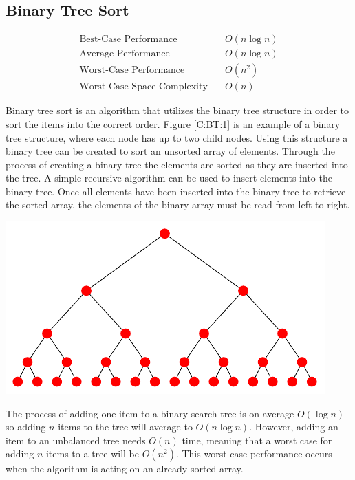 \documentclass{subfile}
\begin{document}
\subsection{Binary Tree Sort}\label{C:BT}
\begin{align*}
 \text{Best-Case Performance}\quad       & O\left(n\log n\right) \\
 \text{Average Performance}\quad         & O\left(n\log n\right) \\
 \text{Worst-Case Performance}\quad      & O\left(n^{2}\right)   \\
 \text{Worst-Case Space Complexity}\quad & O\left(n\right)
\end{align*}
\begin{multicols}{2}
 Binary tree sort is an algorithm that utilizes the binary tree structure in order to sort the items into the correct order. Figure \ref{C:BT:1} is an example of a binary tree structure, where each node has up to two child nodes. Using this structure a binary tree can be created to sort an unsorted array of elements. Through the process of creating a binary tree the elements are sorted as they are inserted into the tree. A simple recursive algorithm can be used to insert elements into the binary tree. Once all elements have been inserted into the binary tree to retrieve the sorted array, the elements of the binary array must be read from left to right.
 \begin{Figure}
  \centering
  \includegraphics[width=\linewidth]{comparison_sorts/binary_tree/img1.pdf}
 \end{Figure}\label{C:BT:1}
 \par
 The process of adding one item to a binary search tree is on average $O\left(\log n\right)$ so adding $n$ items to the tree will average to $O\left( n \log n \right)$. However, adding an item to an unbalanced tree needs $O\left( n\right)$ time, meaning that a worst case for adding $n$ items to a tree will be $O\left( n^{2} \right)$. This worst case performance occurs when the algorithm is acting on an already sorted array.

\end{multicols}
\end{document}
